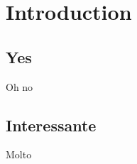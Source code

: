 \chapter{Introduction}

\section{Yes}
Oh no

\section{Interessante}
Molto \cite{aws_inforce_malware}